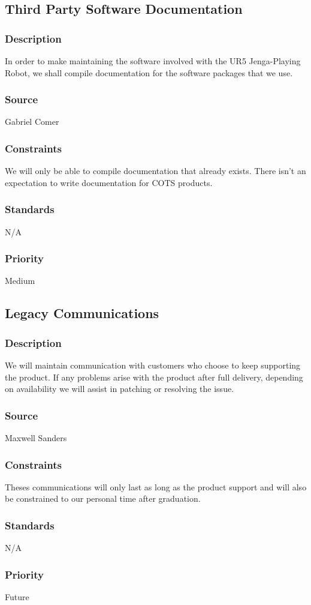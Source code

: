 \subsection{Third Party Software Documentation}
\subsubsection{Description}
In order to make maintaining the software involved with the UR5 Jenga-Playing Robot, we shall compile documentation for the software packages that we use.
\subsubsection{Source}
Gabriel Comer
\subsubsection{Constraints}
We will only be able to compile documentation that already exists. There isn't an expectation to write documentation for COTS products.
\subsubsection{Standards}
N/A
\subsubsection{Priority}
Medium

\subsection{Legacy Communications}
\subsubsection{Description}
We will maintain communication with customers who choose to keep supporting the product. If any problems arise with the product after full delivery, depending on availability we will assist in patching or resolving the issue.
\subsubsection{Source}
Maxwell Sanders
\subsubsection{Constraints}
Theses communications will only last as long as the product support and will also be constrained to our personal time after graduation.
\subsubsection{Standards}
N/A
\subsubsection{Priority}
Future